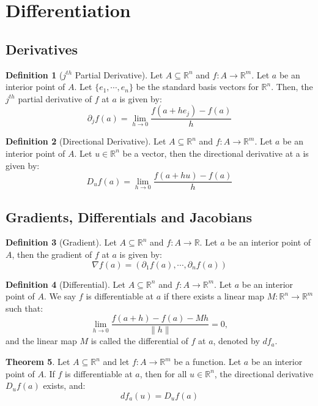 \documentclass[12pt]{article}
\theoremstyle{definition}
\newtheorem{definition}{Definition}[subsection]
\newtheorem{theorem}[definition]{Theorem}
\theoremstyle{remark}
\begin{document}
\section{Differentiation}
\subsection{Derivatives}
\begin{definition}[$j^{th}$ Partial Derivative]
Let $A\subseteq\mathbb{R}^n$ and $f:A\to\mathbb{R}^m$. Let $a$ be an interior point of $A$. Let $\{e_1,\cdots,e_n\}$ be the standard basis vectors for $\mathbb{R}^n$. Then, the $j^{th}$ partial derivative of $f$ at $a$ is given by:
\[
\partial_jf(a)=\lim_{h\to 0}\frac{f(a+he_j)-f(a)}{h}
\]
\end{definition}

\begin{definition}[Directional Derivative]
Let $A\subseteq\mathbb{R}^n$ and $f:A\to\mathbb{R}^m$. Let $a$ be an interior point of $A$. Let $u\in\mathbb{R}^n$ be a vector, then the directional derivative at a is given by:
\[
D_uf(a)=\lim_{h\to 0}\frac{f(a+hu)-f(a)}{h}
\]
\end{definition}

\subsection{Gradients, Differentials and Jacobians}
\begin{definition}[Gradient]
Let $A\subseteq\mathbb{R}^n$ and $f:A\to\mathbb{R}$. Let $a$ be an interior point of $A$, then the gradient of $f$ at $a$ is given by:
\[
\nabla f(a)=(\partial_1f(a),\cdots,\partial_nf(a))
\]
\end{definition}

\begin{definition}[Differential]
Let $A\subseteq\mathbb{R}^n$ and $f:A\to\mathbb{R}^m$. Let $a$ be an interior point of $A$. We say $f$ is differentiable at $a$ if there exists a linear map $M:\mathbb{R}^n\to\mathbb{R}^m$ such that:
\[
\lim_{h\to 0}\frac{f(a+h)-f(a)-Mh}{\|h\|}=0,
\]
and the linear map $M$ is called the differential of $f$ at $a$, denoted by $df_a$.
\end{definition}

\begin{theorem}
Let $A\subseteq\mathbb{R}^n$ and let $f:A\to\mathbb{R}^m$ be a function. Let $a$ be an interior point of $A$. If $f$ is differentiable at $a$, then for all $u\in\mathbb{R}^n$, the directional derivative $D_uf(a)$ exists, and:
\[
df_a(u)=D_uf(a)
\]
\end{theorem}
\end{document}
